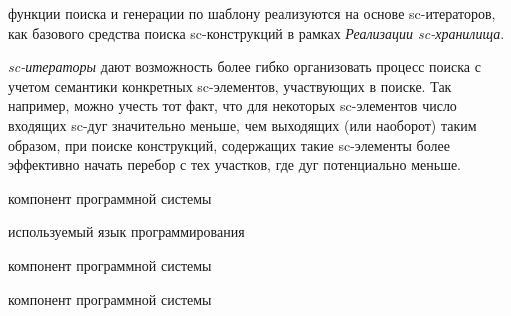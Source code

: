 \begin{SCn}
\begin{scnsubstruct}
{\begin{scnitemize}
                \item функции поиска и генерации по шаблону реализуются на основе sc-итераторов, как базового средства поиска sc-конструкций в рамках \textit{Реализации sc-хранилища}.
                \item \textit{sc-итераторы} дают возможность более гибко организовать процесс поиска с учетом семантики конкретных sc-элементов, участвующих в поиске. Так например, можно учесть тот факт, что для некоторых sc-элементов число входящих sc-дуг значительно меньше, чем выходящих (или наоборот) таким образом, при поиске конструкций, содержащих такие sc-элементы более эффективно начать перебор с тех участков, где дуг потенциально меньше.
            \end{scnitemize}
        }
        \begin{scnrelfromlist}{компонент программной системы}
            \begin{scnindent}
                \begin{scnrelfromlist}{используемый язык программирования}
                \end{scnrelfromlist}
                \begin{scnrelfromlist}{компонент программной системы}
                    \begin{scnindent}
                        \begin{scnrelfromlist}{компонент программной системы}

\end{scnrelfromlist}
\end{scnindent}
\end{scnrelfromlist}
\end{scnindent}
\end{scnrelfromlist}
\end{scnsubstruct}
\end{SCn}
